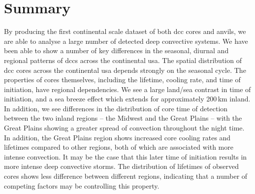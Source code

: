 


\section{Summary}  %

By producing the first continental scale dataset of both \acrshort{dcc} cores and anvils, we are able to analyse a large number of detected deep convective systems.
We have been able to show a number of key differences in the seasonal, diurnal and regional patterns of \acrshort{dcc}s across the continental \acrshort{usa}.
The spatial distribution of \acrshort{dcc} cores across the continental \acrshort{usa} depends strongly on the seasonal cycle.
The properties of cores themselves, including the lifetime, cooling rate, and time of initiation, have regional dependencies.
We see a large land/sea contrast in time of initiation, and a sea breeze effect which extends for approximately 200\,\unit{km} inland.
In addition, we see differences in the distribution of core time of detection between the two inland regions -- the Midwest and the Great Plains -- with the Great Plains showing a greater spread of convection throughout the night time.
In addition, the Great Plains region shows increased core cooling rates and lifetimes compared to other regions, both of which are associated with more intense convection.
It may be the case that this later time of initiation results in more intense deep convective storms.
The distribution of lifetimes of observed cores shows less difference between different regions, indicating that a number of competing factors may be controlling this property.

